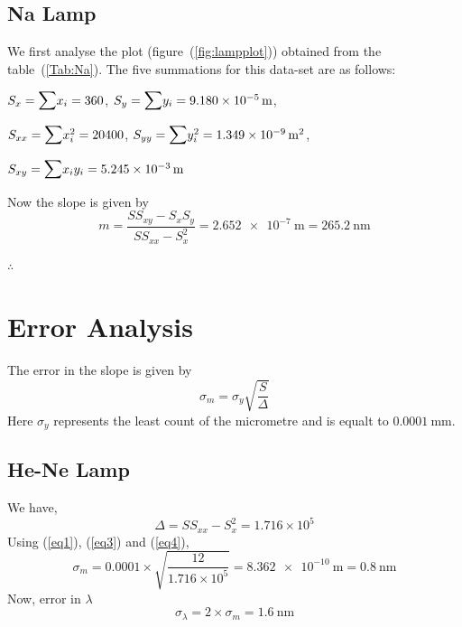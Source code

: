 \documentclass{article}
\begin{document}
    \subsection{Na Lamp}
    We first analyse the plot (figure~(\ref{fig:lampplot})) obtained from the table~(\ref{Tab:Na}).
    The five summations for this data-set are as follows:
    \par
    \vspace{0.5cm}
    $S_{x} = \mathlarger{\mathlarger{\sum}} x_{i} = 360$, \hspace{1cm} $S_{y} = \mathlarger{\mathlarger{\sum}} y_{i} = \SI{9.180e-5}{\metre}$,
    \par
    \vspace{0.5cm}
    $S_{xx} = \mathlarger{\mathlarger{\sum}} x_{i}^2 = 20400$, \hspace{1cm} $S_{yy} = \mathlarger{\mathlarger{\sum}} y_{i}^2 = \SI{1.349e-9}{\metre\squared}$,
    \par
    \vspace{0.5cm}
    $S_{xy} = \mathlarger{\mathlarger{\sum}} x_{i}y_{i} = \SI{5.245e-3}{\metre}$
    \par
    \vspace{0.5cm}
    \noindent
    Now the slope is given by 
    \begin{equation}
    \label{eq2}
        m = \dfrac{S S_{xy} - S_{x}S_{y}}{S S_{xx} - S_{x}^2} = \SI{2.652e-7}{\metre} = \SI{265.2}{\nano \metre}
    \end{equation}
    \par
    \vspace{0.5cm}
    \noindent
    $\therefore$ 
    
\section{Error Analysis}
The error in the slope is given by 
\begin{equation}
\label{eq3}
    \sigma_m = \sigma_y \sqrt{\dfrac{S}{\Delta}}
\end{equation}
\noindent
Here $\sigma_y$ represents the least count of the micrometre and is equalt to $\SI{0.0001}{\milli\metre}$.
    \subsection{He-Ne Lamp}
    We have,
    \begin{equation}
    \label{eq4}
        \Delta = S S_{xx} - S_{x}^2 = 1.716 \times 10^5
    \end{equation}
    Using (\ref{eq1}), (\ref{eq3}) and (\ref{eq4}),  
    \begin{equation}
    \label{eq5}
        \sigma_m = 0.0001 \times \sqrt{\dfrac{12}{1.716 \times 10^5}} = \SI{8.362e-10}{\metre} = \SI{0.8}{\nano \metre}
    \end{equation}
    Now, error in $\lambda$
    \begin{equation}
    \label{eq8}
        \boxed{\sigma_{\lambda} = 2 \times \sigma_{m} = \SI{1.6}{\nano \metre}}
    \end{equation}
\end{document}
